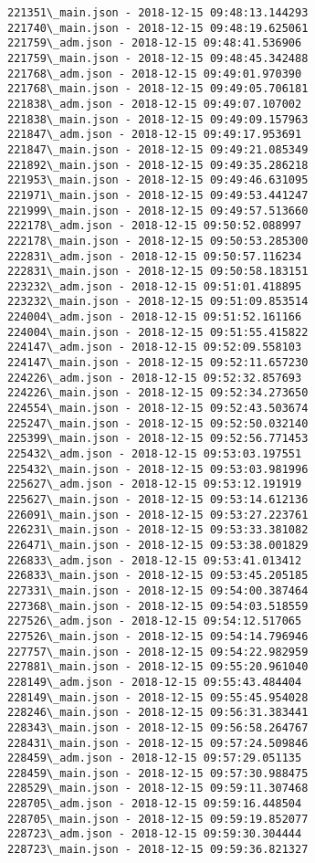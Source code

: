 \documentclass[11pt]{article}
\begin{document}
\begin{Verbatim}[commandchars=\\\{\}]
221351\_main.json - 2018-12-15 09:48:13.144293
221740\_main.json - 2018-12-15 09:48:19.625061
221759\_adm.json - 2018-12-15 09:48:41.536906
221759\_main.json - 2018-12-15 09:48:45.342488
221768\_adm.json - 2018-12-15 09:49:01.970390
221768\_main.json - 2018-12-15 09:49:05.706181
221838\_adm.json - 2018-12-15 09:49:07.107002
221838\_main.json - 2018-12-15 09:49:09.157963
221847\_adm.json - 2018-12-15 09:49:17.953691
221847\_main.json - 2018-12-15 09:49:21.085349
221892\_main.json - 2018-12-15 09:49:35.286218
221953\_main.json - 2018-12-15 09:49:46.631095
221971\_main.json - 2018-12-15 09:49:53.441247
221999\_main.json - 2018-12-15 09:49:57.513660
222178\_adm.json - 2018-12-15 09:50:52.088997
222178\_main.json - 2018-12-15 09:50:53.285300
222831\_adm.json - 2018-12-15 09:50:57.116234
222831\_main.json - 2018-12-15 09:50:58.183151
223232\_adm.json - 2018-12-15 09:51:01.418895
223232\_main.json - 2018-12-15 09:51:09.853514
224004\_adm.json - 2018-12-15 09:51:52.161166
224004\_main.json - 2018-12-15 09:51:55.415822
224147\_adm.json - 2018-12-15 09:52:09.558103
224147\_main.json - 2018-12-15 09:52:11.657230
224226\_adm.json - 2018-12-15 09:52:32.857693
224226\_main.json - 2018-12-15 09:52:34.273650
224554\_main.json - 2018-12-15 09:52:43.503674
225247\_main.json - 2018-12-15 09:52:50.032140
225399\_main.json - 2018-12-15 09:52:56.771453
225432\_adm.json - 2018-12-15 09:53:03.197551
225432\_main.json - 2018-12-15 09:53:03.981996
225627\_adm.json - 2018-12-15 09:53:12.191919
225627\_main.json - 2018-12-15 09:53:14.612136
226091\_main.json - 2018-12-15 09:53:27.223761
226231\_main.json - 2018-12-15 09:53:33.381082
226471\_main.json - 2018-12-15 09:53:38.001829
226833\_adm.json - 2018-12-15 09:53:41.013412
226833\_main.json - 2018-12-15 09:53:45.205185
227331\_main.json - 2018-12-15 09:54:00.387464
227368\_main.json - 2018-12-15 09:54:03.518559
227526\_adm.json - 2018-12-15 09:54:12.517065
227526\_main.json - 2018-12-15 09:54:14.796946
227757\_main.json - 2018-12-15 09:54:22.982959
227881\_main.json - 2018-12-15 09:55:20.961040
228149\_adm.json - 2018-12-15 09:55:43.484404
228149\_main.json - 2018-12-15 09:55:45.954028
228246\_main.json - 2018-12-15 09:56:31.383441
228343\_main.json - 2018-12-15 09:56:58.264767
228431\_main.json - 2018-12-15 09:57:24.509846
228459\_adm.json - 2018-12-15 09:57:29.051135
228459\_main.json - 2018-12-15 09:57:30.988475
228529\_main.json - 2018-12-15 09:59:11.307468
228705\_adm.json - 2018-12-15 09:59:16.448504
228705\_main.json - 2018-12-15 09:59:19.852077
228723\_adm.json - 2018-12-15 09:59:30.304444
228723\_main.json - 2018-12-15 09:59:36.821327

\end{Verbatim}
\end{document}
